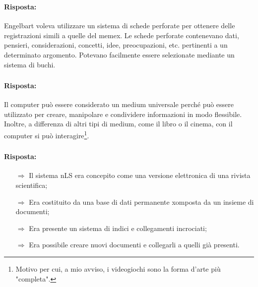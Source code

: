 \subsubsection{}


\paragraph{Risposta:} Engelbart voleva utilizzare un sistema di schede perforate per ottenere delle registrazioni 
simili a quelle del memex. Le schede perforate contenevano dati, pensieri, considerazioni, concetti, idee, preocupazioni,
etc. pertinenti a un determinato argomento. Potevano facilmente essere selezionate mediante un sistema di buchi.

\subsubsection{}


\paragraph{Risposta:} Il computer può essere considerato un medium universale perché può essere utilizzato per
creare, manipolare e condividere informazioni in modo flessibile. Inoltre, a differenza di altri tipi di medium,
come il libro o il cinema, con il computer si può interagire\footnote{Motivo per cui, a mio avviso, i videogiochi sono la forma d'arte più "completa".}.

\subsubsection{}


\paragraph{Risposta:} 

\begin{itemize}
    \item [$\Rightarrow$] Il sistema nLS era concepito come una versione elettronica di una rivista scientifica;
    \item [$\Rightarrow$] Era costituito da una base di dati permanente xomposta da un insieme di documenti;
    \item [$\Rightarrow$] Era presente un sistema di indici e collegamenti incrociati;
    \item [$\Rightarrow$] Era possibile creare nuovi documenti e collegarli a quelli già presenti.
\end{itemize}

